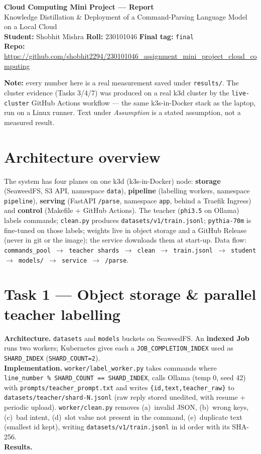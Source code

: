 \documentclass[10pt,a4paper]{article}
\newcommand{\code}[1]{\texttt{\small #1}}
\begin{document}
\begin{center}
  {\LARGE\bfseries Cloud Computing Mini Project --- Report}\\[2pt]
  {\normalsize Knowledge Distillation \& Deployment of a Command-Parsing Language Model on a Local Cloud}\\[6pt]
  \textbf{Student:} Shobhit Mishra \quad\textbf{Roll:} 230101046 \quad\textbf{Final tag:} \code{final}\\[2pt]
  \textbf{Repo:} \url{https://github.com/shobhit2294/230101046_assignment_mini_project_cloud_computing}
\end{center}

\noindent\colorbox{gray!12}{\parbox{\dimexpr\textwidth-2\fboxsep\relax}{\small
\textbf{Note:} every number here is a real measurement saved under \code{results/}. The cluster evidence
(Tasks 3/4/7) was produced on a real k3d cluster by the \code{live-cluster} GitHub Actions workflow --- the
same k3s-in-Docker stack as the laptop, run on a Linux runner. Text under \textit{Assumption} is a stated
assumption, not a measured result.}}

\section{Architecture overview}
The system has four planes on one k3d (k3s-in-Docker) node: \textbf{storage} (SeaweedFS, S3 API, namespace
\code{data}), \textbf{pipeline} (labelling workers, namespace \code{pipeline}), \textbf{serving} (FastAPI
\code{/parse}, namespace \code{app}, behind a Traefik Ingress) and \textbf{control} (Makefile + GitHub
Actions). The teacher (\code{phi3.5} on Ollama) labels commands; \code{clean.py} produces
\code{datasets/v1/train.jsonl}; \code{pythia-70m} is fine-tuned on those labels; weights live in object
storage and a GitHub Release (never in git or the image); the service downloads them at start-up. Data flow:
\code{commands\_pool $\rightarrow$ teacher shards $\rightarrow$ clean $\rightarrow$ train.jsonl $\rightarrow$
student $\rightarrow$ models/ $\rightarrow$ service $\rightarrow$ /parse}.

\section{Task 1 --- Object storage \& parallel teacher labelling}
\textbf{Architecture.} \code{datasets} and \code{models} buckets on SeaweedFS. An \textbf{indexed Job} runs
two workers; Kubernetes gives each a \code{JOB\_COMPLETION\_INDEX} used as \code{SHARD\_INDEX}
(\code{SHARD\_COUNT=2}).\\
\textbf{Implementation.} \code{worker/label\_worker.py} takes commands where
\code{line\_number \% SHARD\_COUNT == SHARD\_INDEX}, calls Ollama (temp 0, seed 42) with
\code{prompts/teacher\_prompt.txt} and writes \code{\{id,text,teacher\_raw\}} to
\code{datasets/teacher/shard-N.jsonl} (raw reply stored unedited, with resume + periodic upload).
\code{worker/clean.py} removes (a)~invalid JSON, (b)~wrong keys, (c)~bad intent, (d)~slot value not present
in the command, (e)~duplicate text (smallest id kept), writing \code{datasets/v1/train.jsonl} in id order
with its SHA-256.\\
\textbf{Results.}
\end{document}
